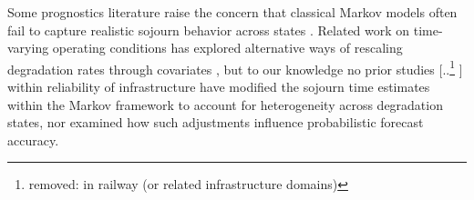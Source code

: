 \documentclass{article}
\providecommand{\DIFadd}[1]{{\protect\color{blue} \sf #1}} %
\providecommand{\DIFdel}[1]{{\protect\color{red} [..\footnote{removed: #1} ]}} %
\providecommand{\DIFaddbegin}{} %
\providecommand{\DIFaddend}{} %
\providecommand{\DIFdelbegin}{} %
\providecommand{\DIFdelend}{} %
\begin{document}
Some prognostics literature raise the concern that classical Markov models often fail to capture realistic sojourn behavior across states \citep{AIZPURUA2022}. Related work on time-varying operating conditions has explored alternative ways of rescaling degradation rates through covariates \citep{liu2024a,bisgaard2024A}, but to our knowledge no prior studies \DIFdelbegin \DIFdel{in railway (or related infrastructure domains) }\DIFdelend \DIFaddbegin \DIFadd{within reliability of infrastructure }\DIFaddend have modified the sojourn time estimates within the Markov framework to account for heterogeneity across degradation states, nor examined how such adjustments influence probabilistic forecast accuracy.





%
\end{document}
